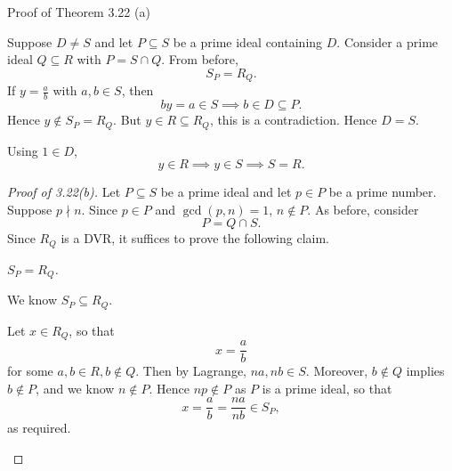 \documentclass[pmath441]{subfiles}
\begin{document}
\begin{boxyproof}{Proof of Theorem 3.22 (a)}
\begin{claim}
            Suppose $D\neq S$ and let $P\subseteq S$ be a prime ideal containing $D$. Consider a prime ideal $Q\subseteq R$ with $P=S\cap Q$. From before,
            \begin{equation*}
                S_P = R_Q.
            \end{equation*}
            If $y=\frac{a}{b}$ with $a,b\in S$, then
            \begin{equation*}
                by = a\in S \implies b\in D\subseteq P.
            \end{equation*}
            Hence $y\notin S_P=R_Q$. But $y\in R\subseteq R_Q$, this is a contradiction. Hence $D=S$.
        \end{claim}

        Using $1\in D$,
        \begin{equation*}
            y\in R\implies y\in S \implies S=R.
        \end{equation*}
        \qedplacedtrue
    \end{boxyproof}

    \begin{proof}[Proof of 3.22(b)]
        Let $P\subseteq S$ be a prime ideal and let $p\in P$ be a prime number. Suppose $p\nmid n$.  Since $p\in P$ and $\gcd\left( p,n \right) = 1$, $n\notin P$. As before, consider
        \begin{equation*}
            P = Q\cap S.
        \end{equation*}
        Since $R_Q$ is a DVR, it suffices to prove the following claim.

        \setcounter{claimcounter}{2}
        \begin{claim}
            \textit{$S_P=R_Q$.}

            We know $S_P\subseteq R_Q$.

            Let $x\in R_Q$, so that
            \begin{equation*}
                x = \frac{a}{b}
            \end{equation*}
            for some $a,b\in R, b\notin Q$. Then by Lagrange, $na,nb\in S$. Moreover, $b\notin Q$ implies $b\notin P$, and we know $n\notin P$. Hence $np\notin P$ as $P$ is a prime ideal, so that
            \begin{equation*}
                x = \frac{a}{b} = \frac{na}{nb} \in S_P,
            \end{equation*}
            as required.
        \end{claim}
    \end{proof}
    
\end{document}
